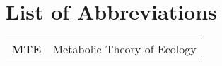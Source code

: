 
\section*{List of Abbreviations}

\begin{tabular}{ l l }
  \textbf{MTE} & Metabolic Theory of Ecology     \\
\end{tabular}
